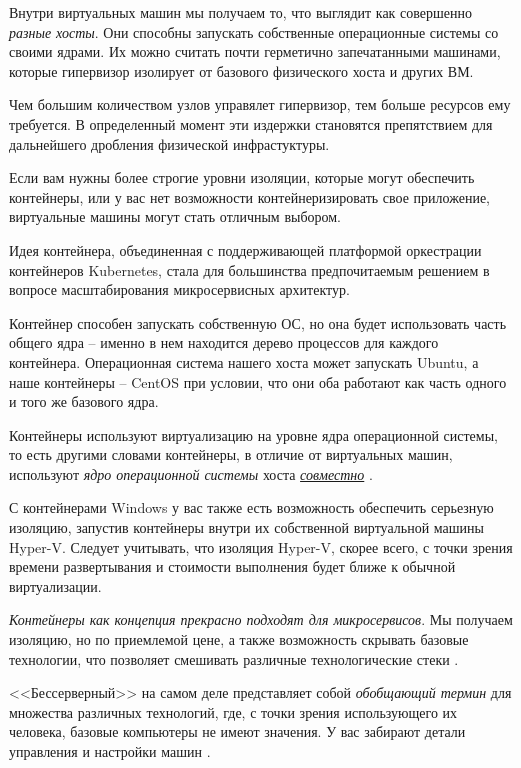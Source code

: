 \documentclass[%
	11pt,
	a4paper,
	utf8,
		]{article}
\begin{document}
Внутри виртуальных машин мы получаем то, что выглядит как совершенно \emph{разные хосты}. Они способны запускать собственные операционные системы со своими ядрами. Их можно считать почти герметично запечатанными машинами, которые гипервизор изолирует от базового физического хоста и других ВМ.

{\color{red}Чем большим количеством узлов управялет гипервизор, тем больше ресурсов ему требуется. В определенный момент эти издержки становятся препятствием для дальнейшего дробления физической инфрастуктуры.} 

Если вам нужны более строгие уровни изоляции, которые могут обеспечить контейнеры, или у вас нет возможности контейнеризировать свое приложение, виртуальные машины могут стать отличным выбором.

Идея контейнера, объединенная с поддерживающей платформой оркестрации контейнеров Kubernetes, стала для большинства предпочитаемым решением в вопросе масштабирования микросервисных архитектур.

Контейнер способен запускать собственную ОС, но она будет использовать часть общего ядра -- именно в нем находится дерево процессов для каждого контейнера. Операционная система нашего хоста может запускать Ubuntu, а наше контейнеры -- CentOS при условии, что они оба работают как часть одного и того же базового ядра.

{\color{blue}Контейнеры используют виртуализацию на уровне ядра операционной системы, то есть другими словами контейнеры, в отличие от виртуальных машин, используют \emph{ядро операционной системы} хоста \underline{\itshape совместно}} \cite[]{docker-2017}.

С контейнерами Windows у вас также есть возможность обеспечить серьезную изоляцию, запустив контейнеры внутри их собственной виртуальной машины Hyper-V. Следует учитывать, что изоляция Hyper-V, скорее всего, с точки зрения времени развертывания и стоимости выполнения будет ближе к обычной виртуализации.

\emph{Контейнеры как концепция прекрасно подходят для микросервисов}. Мы получаем изоляцию, но по приемлемой цене, а также возможность скрывать базовые технологии, что позволяет смешивать различные технологические стеки \cite[]{microservices-2024}.

<<Бессерверный>> на самом деле представляет собой \emph{обобщающий термин} для множества различных технологий, где, с точки зрения использующего их человека, базовые компьютеры не имеют значения. У вас забирают детали управления и настройки машин \cite[]{microservices-2024}.
\end{document}
